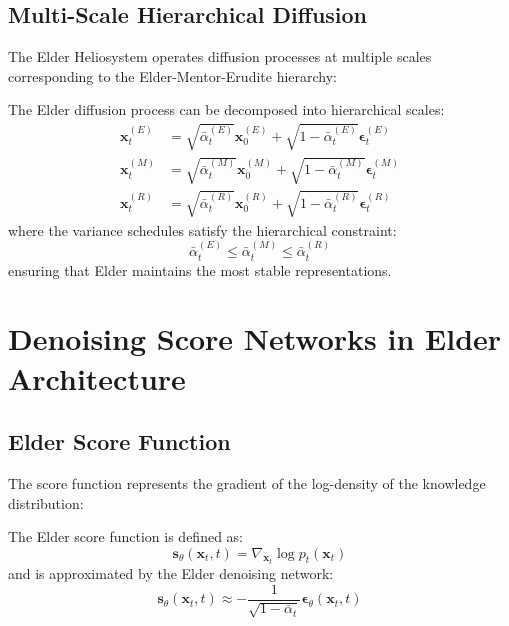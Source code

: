\subsection{Multi-Scale Hierarchical Diffusion}

The Elder Heliosystem operates diffusion processes at multiple scales corresponding to the Elder-Mentor-Erudite hierarchy:

\begin{theorem}
The Elder diffusion process can be decomposed into hierarchical scales:
\begin{align}
\mathbf{x}_t^{(E)} &= \sqrt{\bar{\alpha}_t^{(E)}} \mathbf{x}_0^{(E)} + \sqrt{1-\bar{\alpha}_t^{(E)}} \boldsymbol{\epsilon}_t^{(E)} \\
\mathbf{x}_t^{(M)} &= \sqrt{\bar{\alpha}_t^{(M)}} \mathbf{x}_0^{(M)} + \sqrt{1-\bar{\alpha}_t^{(M)}} \boldsymbol{\epsilon}_t^{(M)} \\
\mathbf{x}_t^{(R)} &= \sqrt{\bar{\alpha}_t^{(R)}} \mathbf{x}_0^{(R)} + \sqrt{1-\bar{\alpha}_t^{(R)}} \boldsymbol{\epsilon}_t^{(R)}
\end{align}
where the variance schedules satisfy the hierarchical constraint:
\begin{equation}
\bar{\alpha}_t^{(E)} \leq \bar{\alpha}_t^{(M)} \leq \bar{\alpha}_t^{(R)}
\end{equation}
ensuring that Elder maintains the most stable representations.
\end{theorem}

\section{Denoising Score Networks in Elder Architecture}

\subsection{Elder Score Function}

The score function represents the gradient of the log-density of the knowledge distribution:

\begin{definition}
The Elder score function is defined as:
\begin{equation}
\mathbf{s}_\theta(\mathbf{x}_t, t) = \nabla_{\mathbf{x}_t} \log p_t(\mathbf{x}_t)
\end{equation}
and is approximated by the Elder denoising network:
\begin{equation}
\mathbf{s}_\theta(\mathbf{x}_t, t) \approx -\frac{1}{\sqrt{1-\bar{\alpha}_t}} \boldsymbol{\epsilon}_\theta(\mathbf{x}_t, t)
\end{equation}
\end{definition}

